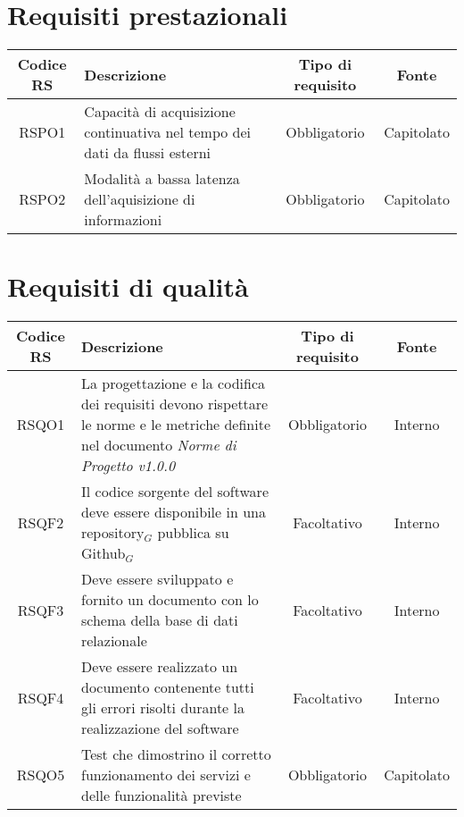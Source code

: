 {\section{Requisiti prestazionali}\label{RequisitiPrestazionali}
\begin{center}
	\renewcommand{\arraystretch}{1.4}
	\begin{tabularx}{\textwidth}{ |c|X|c|c| }
		\hline
		\rowcolor{Melon}
		\textbf{Codice RS} & \textbf{Descrizione} & \textbf{Tipo di requisito} & \textbf{Fonte} \\
		\hline
		RSPO1 & Capacità di acquisizione continuativa nel tempo dei dati da flussi esterni & Obbligatorio & Capitolato  \\
		\hline
		RSPO2 & Modalità a bassa latenza dell'aquisizione di informazioni & Obbligatorio & Capitolato \\

	\end{tabularx}
\end{center}

\section{Requisiti di qualità}\label{RequisitiQualità}
\begin{center}
	\renewcommand{\arraystretch}{1.4}
	\begin{tabularx}{\textwidth}{ |c|X|c|c| }
		\hline
		\rowcolor{Melon}
		\textbf{Codice RS} & \textbf{Descrizione} & \textbf{Tipo di requisito} & \textbf{Fonte} \\
		\hline
		RSQO1  & La progettazione e la codifica dei requisiti devono rispettare le norme e le metriche definite nel documento \textit{Norme di Progetto v1.0.0}& Obbligatorio & Interno \\
		\hline
	RSQF2  & Il codice sorgente del software deve essere disponibile in una repository$_G$ pubblica su Github$_G$  & Facoltativo & Interno \\
	\hline
	RSQF3  & Deve essere sviluppato e fornito un documento con lo schema della base di dati relazionale  & Facoltativo & Interno \\
	\hline
	RSQF4  & Deve essere realizzato un documento contenente tutti gli errori risolti durante la realizzazione del software & Facoltativo & Interno \\
		\hline
	RSQO5  & Test che dimostrino il corretto funzionamento dei servizi e delle funzionalità previste  & Obbligatorio & Capitolato \\
	\hline
	\end{tabularx}
\end{center}


}
